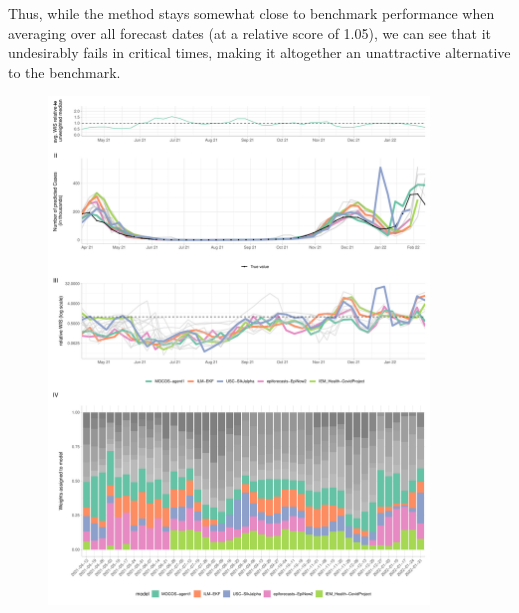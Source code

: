 Thus, while the method stays somewhat close to benchmark performance when averaging over all forecast dates (at a relative score of 1.05), we can see that it undesirably fails in critical times, making it altogether an unattractive alternative to the benchmark.\medskip\\
\begin{figure}
\centering
\includegraphics[width = 0.9\textwidth]{../plots/best_performers_weights_pl}

\end{figure}

